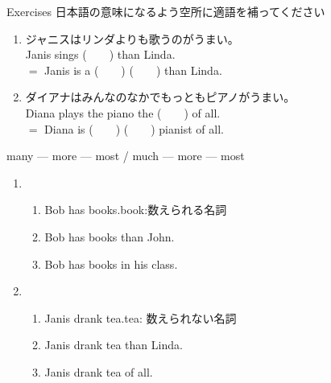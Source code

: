 \documentclass[aspectratio=169,xcolor={dvipsnames,table}]{beamer}
\begin{document}
\begin{frame}[plain]{Exercises}
日本語の意味になるよう空所に適語を補ってください%
\hfill{\scriptsize {}}
\begin{enumerate}
 \item ジャニスはリンダよりも歌うのがうまい。\\
       Janis sings (~~~~) than Linda.\\
       $=$\,\,Janis is a  (~~~~)  (~~~~) than Linda.
 \item ダイアナはみんなのなかでもっともピアノがうまい。\\
       Diana plays the piano the (~~~~) of all.\\
       $=$\,\,Diana is (~~~~)  (~~~~) pianist of all.
\end{enumerate}
\end{frame}
\begin{frame}[plain]{many --- more --- most / much --- more --- most}
 \begin{enumerate}
  \item \begin{enumerate}
	 \item<1-> Bob has  books.\hfill{\scriptsize book:数えられる名詞}
	 \item<2-> Bob has  books than John.
	 \item<3-> Bob has  books in his class.
	\end{enumerate}
  \item \begin{enumerate}
	 \item<4-> Janis drank  tea.\hfill{\scriptsize tea: 数えられない名詞}
	 \item<5-> Janis drank  tea than Linda.
	 \item<6-> Janis drank  tea of all. 

	\end{enumerate}
 \end{enumerate}
%
\hfill{\scriptsize {}}
\end{frame}
\end{document}
